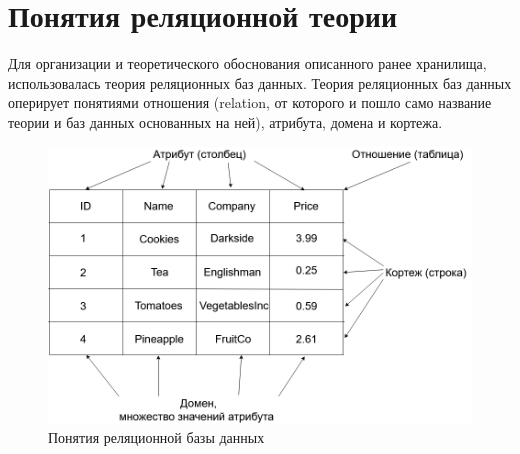 \section{Понятия реляционной теории}
\indent Для организации и теоретического обоснования описанного ранее хранилища, использовалась теория реляционных баз данных.
\indent Теория реляционных баз данных оперирует понятиями отношения (relation, от которого и пошло само название теории и баз данных основанных на ней), атрибута, домена и кортежа.

\begin{figure}[ht]
	\centering
	\includegraphics[width=\linewidth]{pics/databaseExample.png}
	\caption{Понятия реляционной базы данных}
	\label{fig:dbExample}
\end{figure}

